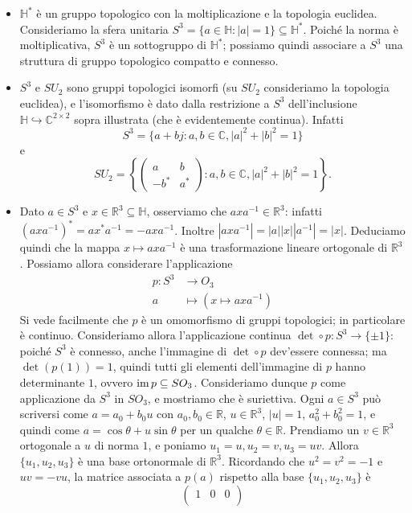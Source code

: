 \begin{itemize}
\item $\mathbb{H}^*$ è un gruppo topologico con la moltiplicazione e la topologia euclidea. Consideriamo la sfera unitaria $S^3=\{a\in\mathbb{H}:|a|=1\}\subseteq\mathbb{H}^*$. Poiché la norma è moltiplicativa, $S^3$ è un sottogruppo di $\mathbb{H}^*$; possiamo quindi associare a $S^3$ una struttura di gruppo topologico compatto e connesso.
\item $S^3$ e $SU_2$ sono gruppi topologici isomorfi (su $SU_2$ consideriamo la topologia euclidea), e l'isomorfismo è dato dalla restrizione a $S^3$ dell'inclusione $\mathbb{H}\hookrightarrow\mathbb{C}^{2\times 2}$ sopra illustrata (che è evidentemente continua). Infatti
$$
S^3=\{a+bj:a,b\in\mathbb{C},|a|^2+|b|^2=1\}
$$
e
$$
SU_2=\left\{\begin{pmatrix}a&b\\-b^*&a^*\end{pmatrix}:a,b\in\mathbb{C},|a|^2+|b|^2=1\right\}.
$$
\item Dato $a\in S^3$ e $x\in\mathbb{R}^3\subseteq\mathbb{H}$, osserviamo che $axa^{-1}\in\mathbb{R}^3$: infatti $(axa^{-1})^*=ax^*a^{-1}=-axa^{-1}$. Inoltre $|axa^{-1}|=|a||x||a^{-1}|=|x|$. Deduciamo quindi che la mappa $x\mapsto axa^{-1}$ è una trasformazione lineare ortogonale di $\mathbb{R}^3$. Possiamo allora considerare l'applicazione
\begin{align*}
p:S^3&\longrightarrow O_3\\
a&\longmapsto(x\mapsto axa^{-1})
\end{align*}
Si vede facilmente che $p$ è un omomorfismo di gruppi topologici; in particolare è continuo. Consideriamo allora l'applicazione continua $\det\circ p:S^3\to\{\pm 1\}$: poiché $S^3$ è connesso, anche l'immagine di $\det\circ p$ dev'essere connessa; ma $\det(p(1))=1$, quindi tutti gli elementi dell'immagine di $p$ hanno determinante $1$, ovvero $\im p\subseteq SO_3$. Consideriamo dunque $p$ come applicazione da $S^3$ in $SO_3$, e mostriamo che è suriettiva. Ogni $a\in S^3$ può scriversi come $a=a_0+b_0u$ con $a_0,b_0\in\mathbb{R}$, $u\in\mathbb{R}^3$, $|u|=1$, $a_0^2+b_0^2=1$, e quindi come $a=\cos\theta+u\sin\theta$ per un qualche $\theta\in\mathbb{R}$. Prendiamo un $v\in\mathbb{R}^3$ ortogonale a $u$ di norma $1$, e poniamo $u_1=u\comma u_2=v\comma u_3=uv$. Allora $\{u_1,u_2,u_3\}$ è una base ortonormale di $\mathbb{R}^3$. Ricordando che $u^2=v^2=-1$ e $uv=-vu$, la matrice associata a $p(a)$ rispetto alla base $\{u_1,u_2,u_3\}$ è
$$
\begin{pmatrix}
1&0&0\\

\end{pmatrix}$$
\end{itemize}
